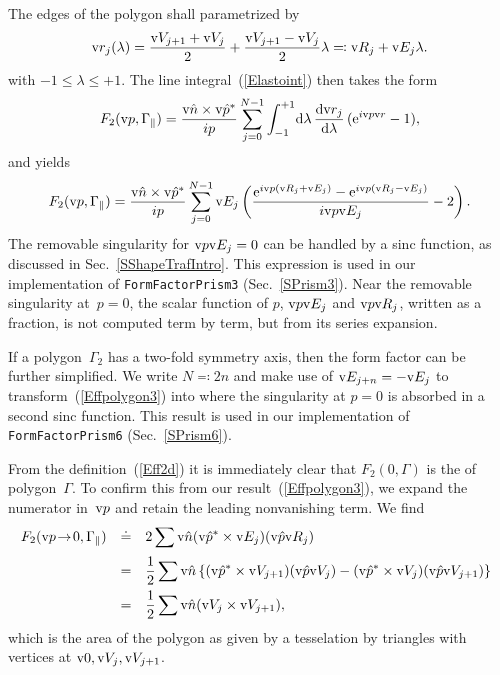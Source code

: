 The edges of the polygon shall parametrized by
\begin{equation}
  \text{v}{r}_j(\lambda) = \frac{\text{v}{V}_{j+1}+\text{v}{V}_j}{2} + \frac{\text{v}{V}_{j+1}-\text{v}{V}_j}{2} \lambda
  \eqqcolon \text{v}{R}_j + \text{v}{E}_j\lambda.
\end{equation}
with $-1\le\lambda\le+1$.
The line integral~(\ref{Elastoint}) then takes the form
\begin{equation}
    F_2(\text{v}{p},\Gamma_\parallel)
   = \frac{\text{v}{\hat n}\times\text{v}{\hat p}^*}{ip} \sum_{j=0}^{N-1}
              \int_{-1}^{+1}\!\text{d}\lambda\, \frac{\text{d}\text{v}{r}_j}{\text{d}\lambda}\,(\text{e}^{i\text{v}{p}\text{v}{r}}-1),
\end{equation}
and yields
\begin{equation}\label{Effpolygon1}
    F_2(\text{v}{p},\Gamma_\parallel)
    = \frac{\text{v}{\hat n}\times\text{v}{\hat p}^*}{ip}
      \sum_{j=0}^{N-1} \text{v}{E}_j
      \left( \frac{\text{e}^{i\text{v}{p}(\text{v}{R}_j+\text{v}{E}_j)}-\text{e}^{i\text{v}{p}(\text{v}{R}_j-\text{v}{E}_j)}}{i\text{v}{p}\text{v}{E}_j} - 2 \right).
\end{equation}
The removable singularity for $\text{v}{p}\text{v}{E}_j=0$
can be handled by a sinc function, as discussed in Sec.~\ref{SShapeTrafIntro}.
This expression is used in our implementation of \texttt{FormFactorPrism3}
(Sec.~\ref{SPrism3}).
Near the removable singularity at~$p=0$,
the scalar function of $p$, $\text{v}{p}\text{v}{E}_j$ and $\text{v}{p}\text{v}{R}_j$,
written as a fraction,
 is not computed term by term,
but from its series expansion.

If a polygon~$\Gamma_2$ has a two-fold symmetry axis,
then the form factor can be further simplified.
We write $N\eqqcolon2n$
and make use of $\text{v}{E}_{j+n}=-\text{v}{E}_j$ to transform~(\ref{Effpolygon3}) into
where the singularity at $p=0$ is absorbed in a second sinc function.
This result is used in our implementation of \texttt{FormFactorPrism6}
(Sec.~\ref{SPrism6}).
%

From the definition~(\ref{Eff2d}) it is immediately clear
that $F_2(0,\Gamma)$ is the  of polygon~$\Gamma$.
To confirm this from our result~(\ref{Effpolygon3}),
we expand the numerator in~$\text{v}{p}$ and retain the leading nonvanishing term.
We find
\begin{equation}\label{Effarea}
  \begin{array}{@{}lcl}
  F_2(\qp\!\to\!0,\Gp)
    &\doteq& \displaystyle 2\sum \n(\uqp^*\times\E_j) (\uqp\R_j)\\[1.8ex]
    &=&\displaystyle \frac{1}{2}\sum \n\left\{
        (\uqp^*\times\V_{j+1})(\uqp\V_j)
      - (\uqp^*\times\V_j)(\uqp\V_{j+1})
      \right\}\\[1.8ex]
    &=&\displaystyle \frac{1}{2}\sum \n(\V_j\times\V_{j+1}),
  \end{array}
\end{equation}
which is the area of the polygon
as given by a tesselation by triangles with vertices at $\text{v}{0},\text{v}{V}_j,\text{v}{V}_{j+1}$.


